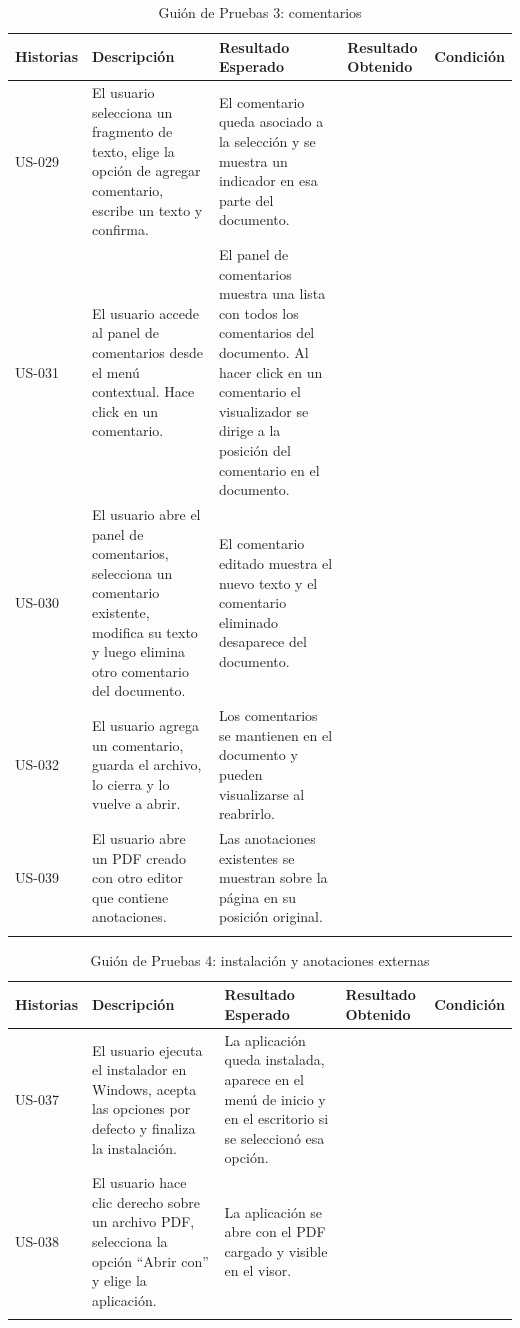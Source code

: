 \begin{longtable}{ | p{2cm} | p{3cm} | p{4cm} | p{4cm} | c |}
      \hline
      \textbf{Historias} & \textbf{Descripción} & \textbf{Resultado Esperado} & \textbf{Resultado Obtenido} & \textbf{Condición}\\
      \hline
      US-029 &
      El usuario selecciona un fragmento de texto, elige la opción de agregar comentario, escribe un texto y confirma. &
      El comentario queda asociado a la selección y se muestra un indicador en esa parte del documento. &
       &
      \\
      \hline
      US-031 &
      El usuario accede al panel de comentarios desde el menú contextual. Hace click en un comentario. &
      El panel de comentarios muestra una lista con todos los comentarios del documento. Al hacer click en un comentario el visualizador se dirige a la posición del comentario en el documento. &
       &
      \\
      \hline
      US-030 &
      El usuario abre el panel de comentarios, selecciona un comentario existente, modifica su texto y luego elimina otro comentario del documento. &
      El comentario editado muestra el nuevo texto y el comentario eliminado desaparece del documento. &
       &
      \\      
      \hline
      US-032 &
      El usuario agrega un comentario, guarda el archivo, lo cierra y lo vuelve a abrir. &
      Los comentarios se mantienen en el documento y pueden visualizarse al reabrirlo. &
       &
      \\      
      \hline
      US-039 &
      El usuario abre un PDF creado con otro editor que contiene anotaciones. &
      Las anotaciones existentes se muestran sobre la página en su posición original. &
       &
      \\
      \hline
 
      \caption{Guión de Pruebas 3: comentarios}
      \label{TestScript3}
\end{longtable}
 
\begin{longtable}{ | p{2cm} | p{3cm} | p{4cm} | p{4cm} | c |}
      \hline
      \textbf{Historias} & \textbf{Descripción} & \textbf{Resultado Esperado} & \textbf{Resultado Obtenido} & \textbf{Condición}\\
      \hline
      US-037 &
      El usuario ejecuta el instalador en Windows, acepta las opciones por defecto y finaliza la instalación. &
      La aplicación queda instalada, aparece en el menú de inicio y en el escritorio si se seleccionó esa opción. &
       &
      \\
      \hline
      US-038 &
      El usuario hace clic derecho sobre un archivo PDF, selecciona la opción “Abrir con” y elige la aplicación. &
      La aplicación se abre con el PDF cargado y visible en el visor. &
       &
      \\
      \hline
      
 
      \caption{Guión de Pruebas 4: instalación y anotaciones externas}
      \label{TestScript4}

\end{longtable}

